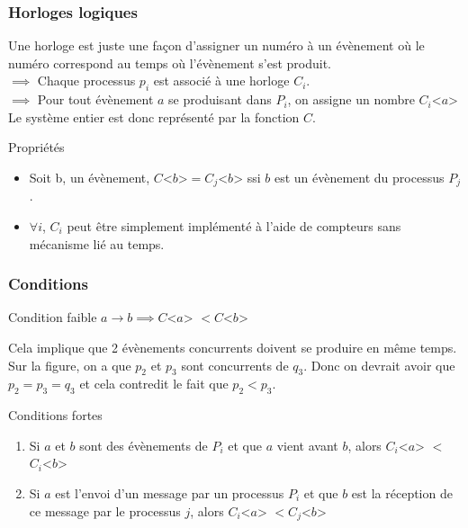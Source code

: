 \documentclass[compress]{beamer}
\begin{document}
\begin{frame}
\frametitle{Horloges logiques}
Une horloge est juste une façon d'assigner un numéro à un évènement où le numéro correspond au temps où l'évènement s'est produit.\\
$\implies$ Chaque processus $p_i$ est associé à une horloge $C_i$.\\
$\implies$ Pour tout évènement $a$ se produisant dans $P_i$, on assigne un nombre $C_i$<$a$> \\
Le système entier est donc représenté par la fonction $C$.\\
\begin{block}{Propriétés}
\begin{itemize}
\item Soit b, un évènement, $C$<$b$>$ = C_j$<$b$> ssi $b$ est un évènement du processus $P_j$.\\
\item $\forall i$, $C_i$ peut être simplement implémenté à l'aide de compteurs sans mécanisme lié au temps.
\end{itemize} 
\end{block}
\end{frame}

\begin{frame}
\frametitle{Conditions}
\begin{block}{Condition faible}
$a \rightarrow b \implies C$<$a$> $ < C$<$b$>
\end{block}
Cela implique que 2 évènements concurrents doivent se produire en même temps. Sur la figure, on a que $p_2$ et $p_3$ sont concurrents de $q_3$. Donc on devrait avoir que $p_2 = p_3 = q_3$ et cela contredit le fait que $p_2 < p_3$.
\begin{block}{Conditions fortes}
\begin{enumerate}
\item Si $a$ et $b$ sont des évènements de $P_i$ et que $a$ vient avant $b$, alors $C_i$<$a$> $<$ $C_i$<$b$>
\item Si $a$ est l'envoi d'un message par un processus $P_i$ et que $b$ est la réception de ce message par le processus $j$, alors $C_i$<$a$> $< C_j$<$b$>
\end{enumerate}
\end{block}
\end{frame}


\end{document}
